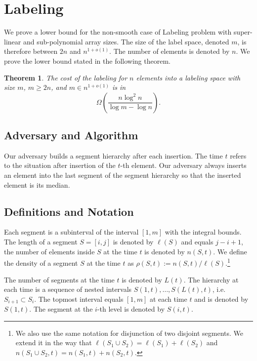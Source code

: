 \documentclass[11pt]{article} %
\newcommand{\density}[2]{\rho(#1, #2)}
\newcommand{\length}[1]{\ell(#1)}
\newcommand{\scount}[2]{n(#1, #2)}
\newcommand{\segment}[2]{S(#1, #2)}
\newcommand{\segments}[1]{L(#1)}
\newtheorem{theorem}[definition]{Theorem}
\begin{document}
\section{Labeling}

We prove a lower bound for the non-smooth case of Labeling problem with super-linear and sub-polynomial array sizes.
The size of the label space, denoted $m$, is therefore between $2n$ and $n^{1 + o(1)}$.
The number of elements is denoted by $n$.
We prove the lower bound stated in the following theorem.
\begin{theorem}
\label{thm:lower-bound}
The cost of the labeling for $n$ elements into a labeling space with size $m$, $m \geq 2n$, and $m \in n^{1 + o(1)}$ is in
\[
\Omega\left(\frac{n\log^2 n}{\log m - \log n}\right).
\]
\end{theorem}

\subsection{Adversary and Algorithm}
Our adversary builds a segment hierarchy after each insertion. 
The time $t$ refers to the situation after insertion of the $t$-th element.
Our adversary always inserts an element into the last segment of the segment hierarchy so that the inserted element is its median.

\subsection{Definitions and Notation}
Each segment is a subinterval of the interval $[1, m]$ with the integral bounds.
The length of a segment $S = [i, j]$ is denoted by $\length{S}$ and equals $j - i + 1$, the number of elements inside $S$ at the time $t$ is denoted by $\scount{S}{t}$.
We define the density of a segment $S$ at the time $t$ as $\density{S}{t} := \scount{S}{t}/\length{S}$.\footnote{We also use the same notation for disjunction of two disjoint segments. We extend it in the way that $\length{S_1 \cup S_2} = \length{S_1} + \length{S_2}$ and $\scount{S_1 \cup S_2}{t} = \scount{S_1}{t} + \scount{S_2}{t}$.}

The number of segments at the time $t$ is denoted by $\segments{t}$.
The hierarchy at each time is a sequence of nested intervals $\segment{1}{t}, \dots, \segment{\segments{t}}{t}$, i.e. $S_{i + 1} \subset S_{i}$.
The topmost interval equals $[1, m]$ at each time $t$ and is denoted by $\segment{1}{t}$.
The segment at the $i$-th level is denoted by $\segment{i}{t}$.
\end{document}
